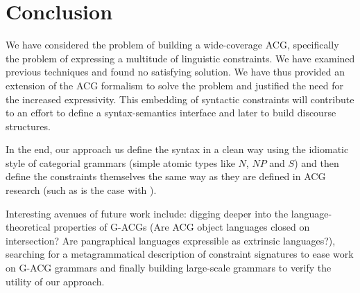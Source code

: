\documentclass{llncs}
\begin{document}
\section{Conclusion}

We have considered the problem of building a wide-coverage ACG, specifically
the problem of expressing a multitude of linguistic constraints. We have
examined previous techniques and found no satisfying solution. We have thus
provided an extension of the ACG formalism to solve the problem and justified
the need for the increased expressivity. This embedding of syntactic
constraints will contribute to an effort to define a syntax-semantics
interface and later to build discourse structures.

In the end, our approach us define the syntax in a clean way using the
idiomatic style of categorial grammars (simple atomic types like $N$, $NP$ and
$S$) and then define the constraints themselves the same way as they are
defined in ACG research (such as is the case with
\cite{pogodalla2012controlling}).

Interesting avenues of future work include: digging deeper into the
language-theoretical properties of G-ACGs (Are ACG object languages closed on
intersection? Are pangraphical languages expressible as extrinsic languages?),
searching for a metagrammatical description of constraint signatures to ease
work on G-ACG grammars and finally building large-scale grammars to verify the
utility of our approach.

%
%



\end{document}
